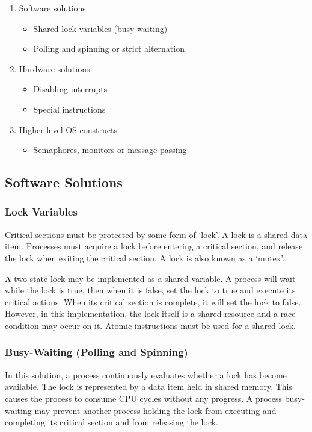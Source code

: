 \begin{enumerate}
  \item Software solutions
  \begin{itemize}
    \item Shared lock variables (busy-waiting)
    \item Polling and spinning or strict alternation
  \end{itemize}
  \item Hardware solutions
  \begin{itemize}
    \item Disabling interrupts
    \item Special instructions
  \end{itemize}
  \item Higher-level OS constructs
  \begin{itemize}
    \item Semaphores, monitors or message passing
  \end{itemize}
\end{enumerate}

\subsection{Software Solutions}

\subsubsection{Lock Variables}

Critical sections must be protected by some form of `lock'.
A lock is a shared data item.
Processes must acquire a lock before entering a critical section, and release the lock when exiting the critical section.
A lock is also known as a `mutex'.

A two state lock may be implemented as a shared variable.
A process will wait while the lock is true, then when it is false, set the lock to true and execute its critical actions.
When its critical section is complete, it will set the lock to false.
However, in this implementation, the lock itself is a shared resource and a race condition may occur on it.
Atomic instructions must be used for a shared lock.

\subsubsection{Busy-Waiting (Polling and Spinning)}

In this solution, a process continuously evaluates whether a lock has become available.
The lock is represented by a data item held in shared memory.
This causes the process to consume CPU cycles without any progress.
A process busy-waiting may prevent another process holding the lock from executing and completing its critical section and from releasing the lock.

